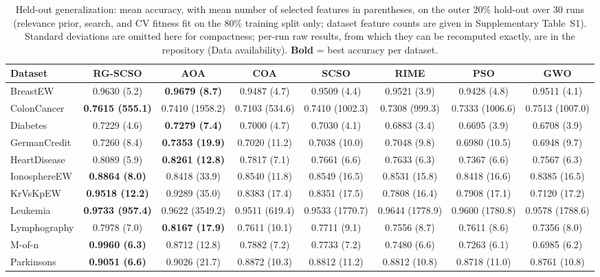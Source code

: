 \documentclass[iicol,sn-basic,pdflatex]{sn-jnl}
\begin{document}
\begin{table}[t]
\centering
\caption{Held-out generalization: mean accuracy, with mean number of selected features in parentheses, on the outer 20\% hold-out over 30 runs (relevance prior, search, and CV fitness fit on the 80\% training split only; dataset feature counts are given in Supplementary Table~S1). Standard deviations are omitted here for compactness; per-run raw results, from which they can be recomputed exactly, are in the repository (Data availability). \textbf{Bold} = best accuracy per dataset.}
\label{tab:heldout}
\tiny
\setlength{\tabcolsep}{1.0pt}
\begin{tabular}{lccccccc}
\toprule
Dataset & RG-SCSO & AOA & COA & SCSO & RIME & PSO & GWO \\
\midrule
BreastEW & 0.9630 (5.2) & \textbf{0.9679 (8.7)} & 0.9487 (4.7) & 0.9509 (4.4) & 0.9521 (3.9) & 0.9428 (4.8) & 0.9511 (4.1) \\
ColonCancer & \textbf{0.7615 (555.1)} & 0.7410 (1958.2) & 0.7103 (534.6) & 0.7410 (1002.3) & 0.7308 (999.3) & 0.7333 (1006.6) & 0.7513 (1007.0) \\
Diabetes & 0.7229 (4.6) & \textbf{0.7279 (7.4)} & 0.7000 (4.7) & 0.7030 (4.1) & 0.6883 (3.4) & 0.6695 (3.9) & 0.6708 (3.9) \\
GermanCredit & 0.7260 (8.4) & \textbf{0.7353 (19.9)} & 0.7020 (11.2) & 0.7038 (10.0) & 0.7048 (9.8) & 0.6980 (10.5) & 0.6948 (9.7) \\
HeartDisease & 0.8089 (5.9) & \textbf{0.8261 (12.8)} & 0.7817 (7.1) & 0.7661 (6.6) & 0.7633 (6.3) & 0.7367 (6.6) & 0.7567 (6.3) \\
IonosphereEW & \textbf{0.8864 (8.0)} & 0.8418 (33.9) & 0.8540 (11.8) & 0.8549 (16.5) & 0.8531 (15.8) & 0.8418 (16.6) & 0.8385 (16.5) \\
KrVsKpEW & \textbf{0.9518 (12.2)} & 0.9289 (35.0) & 0.8383 (17.4) & 0.8351 (17.5) & 0.7808 (16.4) & 0.7908 (17.1) & 0.7120 (17.2) \\
Leukemia & \textbf{0.9733 (957.4)} & 0.9622 (3549.2) & 0.9511 (619.4) & 0.9533 (1770.7) & 0.9644 (1778.9) & 0.9600 (1780.8) & 0.9578 (1788.6) \\
Lymphography & 0.7978 (7.0) & \textbf{0.8167 (17.9)} & 0.7611 (10.1) & 0.7711 (9.1) & 0.7556 (8.7) & 0.7611 (8.6) & 0.7356 (8.0) \\
M-of-n & \textbf{0.9960 (6.3)} & 0.8712 (12.8) & 0.7882 (7.2) & 0.7733 (7.2) & 0.7480 (6.6) & 0.7263 (6.1) & 0.6985 (6.2) \\
Parkinsons & \textbf{0.9051 (6.6)} & 0.9026 (21.7) & 0.8872 (10.3) & 0.8812 (11.2) & 0.8812 (10.8) & 0.8718 (11.0) & 0.8761 (10.8) \\

\end{tabular}
\end{table}
\end{document}
